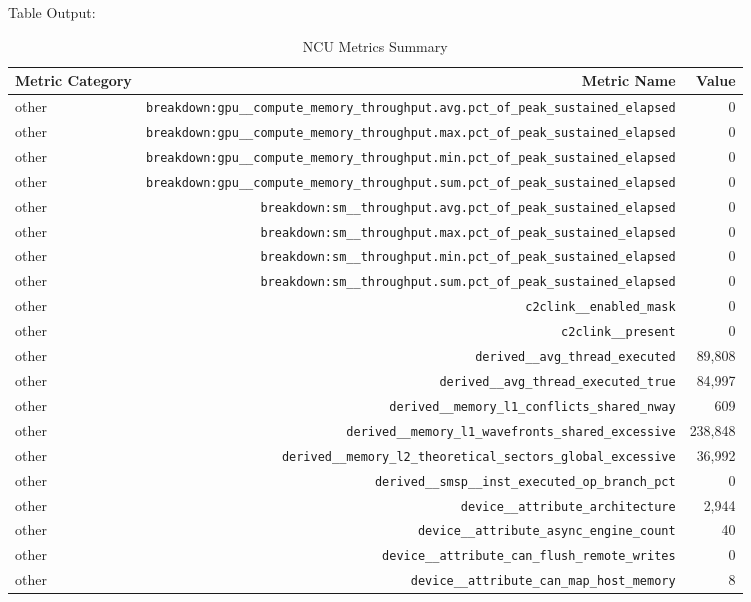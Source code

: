 \nLaTeX Table Output:
\begin{table}[h]
\centering
\caption{NCU Metrics Summary}
\label{tab:ncu_metrics}
\begin{tabular}{|l|r|r|}
\hline
\textbf{Metric Category} & \textbf{Metric Name} & \textbf{Value} \\
\hline
other & \texttt{breakdown:gpu__compute_memory_throughput.avg.pct_of_peak_sustained_elapsed} & 0 \\
other & \texttt{breakdown:gpu__compute_memory_throughput.max.pct_of_peak_sustained_elapsed} & 0 \\
other & \texttt{breakdown:gpu__compute_memory_throughput.min.pct_of_peak_sustained_elapsed} & 0 \\
other & \texttt{breakdown:gpu__compute_memory_throughput.sum.pct_of_peak_sustained_elapsed} & 0 \\
other & \texttt{breakdown:sm__throughput.avg.pct_of_peak_sustained_elapsed} & 0 \\
other & \texttt{breakdown:sm__throughput.max.pct_of_peak_sustained_elapsed} & 0 \\
other & \texttt{breakdown:sm__throughput.min.pct_of_peak_sustained_elapsed} & 0 \\
other & \texttt{breakdown:sm__throughput.sum.pct_of_peak_sustained_elapsed} & 0 \\
other & \texttt{c2clink__enabled_mask} & 0 \\
other & \texttt{c2clink__present} & 0 \\
other & \texttt{derived__avg_thread_executed} & 89,808 \\
other & \texttt{derived__avg_thread_executed_true} & 84,997 \\
other & \texttt{derived__memory_l1_conflicts_shared_nway} & 609 \\
other & \texttt{derived__memory_l1_wavefronts_shared_excessive} & 238,848 \\
other & \texttt{derived__memory_l2_theoretical_sectors_global_excessive} & 36,992 \\
other & \texttt{derived__smsp__inst_executed_op_branch_pct} & 0 \\
other & \texttt{device__attribute_architecture} & 2,944 \\
other & \texttt{device__attribute_async_engine_count} & 40 \\
other & \texttt{device__attribute_can_flush_remote_writes} & 0 \\
other & \texttt{device__attribute_can_map_host_memory} & 8 \\

\end{tabular}
\end{table}

